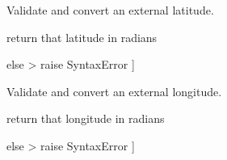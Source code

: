 \documentclass[letterpaper,10pt,english]{sphinxmanual}
\begin{document}

\begin{fulllineitems}
\label{\detokenize{api/killMS.Data:killMS.Data.sidereal.parseLat}}
\pysigstartsignatures
{}
\pysigstopsignatures
\sphinxAtStartPar
Validate and convert an external latitude.
\begin{description}
\sphinxlineitem{{[} s is a nonempty string \sphinxhyphen{}\textgreater{}}\begin{description}
\sphinxAtStartPar
return that latitude in radians

\end{description}

\sphinxAtStartPar
else \sphinxhyphen{}\textgreater{} raise SyntaxError {]}

\end{description}

\end{fulllineitems}


\begin{fulllineitems}
\label{\detokenize{api/killMS.Data:killMS.Data.sidereal.parseLon}}
\pysigstartsignatures
{}
\pysigstopsignatures
\sphinxAtStartPar
Validate and convert an external longitude.
\begin{description}
\sphinxlineitem{{[} s is a nonempty string \sphinxhyphen{}\textgreater{}}\begin{description}
\sphinxAtStartPar
return that longitude in radians

\end{description}

\sphinxAtStartPar
else \sphinxhyphen{}\textgreater{} raise SyntaxError {]}

\end{description}

\end{fulllineitems}
\end{document}
